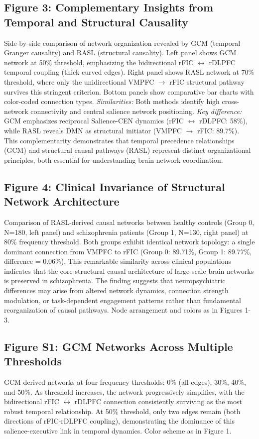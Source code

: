 \subsection*{Figure 3: Complementary Insights from Temporal and Structural Causality}

Side-by-side comparison of network organization revealed by GCM (temporal Granger causality) and RASL (structural causality). Left panel shows GCM network at 50\% threshold, emphasizing the bidirectional rFIC $\leftrightarrow$ rDLPFC temporal coupling (thick curved edges). Right panel shows RASL network at 70\% threshold, where only the unidirectional VMPFC $\rightarrow$ rFIC structural pathway survives this stringent criterion. Bottom panels show comparative bar charts with color-coded connection types. \textit{Similarities:} Both methods identify high cross-network connectivity and central salience network positioning. \textit{Key difference:} GCM emphasizes reciprocal Salience-CEN dynamics (rFIC $\leftrightarrow$ rDLPFC: 58\%), while RASL reveals DMN as structural initiator (VMPFC $\rightarrow$ rFIC: 89.7\%). This complementarity demonstrates that temporal precedence relationships (GCM) and structural causal pathways (RASL) represent distinct organizational principles, both essential for understanding brain network coordination.

\subsection*{Figure 4: Clinical Invariance of Structural Network Architecture}

Comparison of RASL-derived causal networks between healthy controls (Group 0, N=180, left panel) and schizophrenia patients (Group 1, N=130, right panel) at 80\% frequency threshold. Both groups exhibit identical network topology: a single dominant connection from VMPFC to rFIC (Group 0: 89.71\%, Group 1: 89.77\%, difference = 0.06\%). This remarkable similarity across clinical populations indicates that the core structural causal architecture of large-scale brain networks is preserved in schizophrenia. The finding suggests that neuropsychiatric differences may arise from altered network dynamics, connection strength modulation, or task-dependent engagement patterns rather than fundamental reorganization of causal pathways. Node arrangement and colors as in Figures 1-3.


\subsection*{Figure S1: GCM Networks Across Multiple Thresholds}
GCM-derived networks at four frequency thresholds: 0\% (all edges), 30\%, 40\%, and 50\%. As threshold increases, the network progressively simplifies, with the bidirectional rFIC $\leftrightarrow$ rDLPFC connection consistently surviving as the most robust temporal relationship. At 50\% threshold, only two edges remain (both directions of rFIC-rDLPFC coupling), demonstrating the dominance of this salience-executive link in temporal dynamics. Color scheme as in Figure 1.

